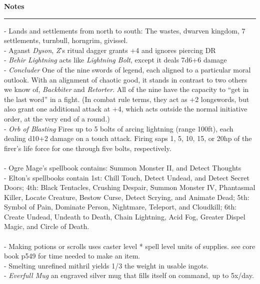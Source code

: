 \documentclass[letterpaper]{article}
\newcommand{\e}[1]{\emph{#1}}
\newcommand{\B}[1]{\textbf{#1}}
\newenvironment{notesection}[1]
{ {\huge \B{#1}}\hrule\vspace{0.5em}\begingroup\fontsize{9pt}{12pt}\selectfont}
{\endgroup}
\begin{document}
\begin{notesection}{Notes}
- Lands and settlements from north to south: The wastes, dwarven kingdom, 7 settlements, turnbull, horngrim, givissel.\\
- Aganst \e{Dyson}, \e{Z}'s ritual dagger grants +4 and ignores piercing DR\\
- \e{Behir Lightning} acts like \e{Lightning Bolt}, except it deals 7d6+6 damage\\
- \e{Concluder} One of the nine swords of legend, each aligned to a particular moral outlook. With an alignment of chaotic good, it stands in contrast to two others we know of, \e{Backbiter} and \e{Retorter}. All of the nine have the capacity to ``get in the last word'' in a fight. (In combat rule terms, they act as +2 longswords, but also grant one additional attack at +4, which acts outside the normal initiative order, at the very end of a round.)\\
- \e{Orb of Blasting} Fires up to 5 bolts of arcing lightning (range 100ft), each dealing d10+2 damage on a touch attack. Firing saps 1, 5, 10, 15, or 20hp of the firer's life force for one through five bolts, respectively.\\\\
- Ogre Mage's spellbook contains: Summon Monster II, and Detect Thoughts\\
- Elton's spellbooks contain 1st: Chill Touch, Detect Undead, and Detect Secret Doors; 4th: Black Tentacles, Crushing Despair, Summon Monster IV, Phantasmal Killer, Locate Creature, Bestow Curse, Detect Scrying, and Animate Dead; 5th: Symbol of Pain, Dominate Person, Nightmare, Teleport, and Cloudkill; 6th: Create Undead, Undeath to Death, Chain Lightning, Acid Fog, Greater Dispel Magic, and Circle of Death.\\\\
- Making potions or scrolls uses caster level * spell level units of supplies. see core book p549 for time needed to make an item.\\
- Smelting unrefined mithril yields 1/3 the weight in usable ingots.\\
- \e{Everfull Mug} an engraved silver mug that fills itself on command, up to 5x/day.\\


\end{notesection}
\end{document}

